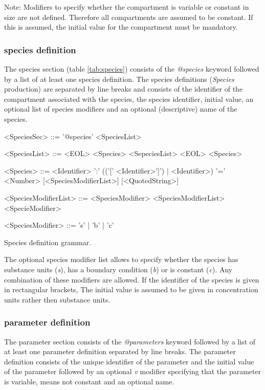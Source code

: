 \documentclass[a4paper]{article}
\begin{document}
Note: Modifiers to specify whether the compartment is variable or constant in size are not defined. Therefore all compartments are assumed to be constant. If this is assumed, the initial value for the compartment must be mandatory.


\subsubsection*{species definition}
The species section (table \ref{tab:species}) consists of the \emph{@species} keyword followed by a list of at least one species definition. The species definitions (\emph{Species} production) are separated by line breaks and consists of the identifier of the compartment associated with the species, the species identifier, initial value, an optional list of species modifiers and an optional (descriptive) name of the species.

\begin{table}[h!]
\begin{grammar}
<SpeciesSec> ::= '@species' <SpeciesList>

<SpeciesList> ::= <EOL> <Species> <SepeciesList> 
 \alt <EOL> <Species> 
 
<Species> ::= <Identifier> ':' (('[' <Identifier>']') | <Identifier>) '=' <Number> [<SpeciesModifierList>] [<QuotedString>]

<SpeciesModifierList> ::= <SpeciesModifier> <SpeciesModifierList>
  \alt <SpecieModifier>
  
<SpeciesModifier> ::= 's' | 'b' | 'c'
\end{grammar}
\caption{Species definition grammar.} \label{tab:species}
\end{table}

The optional species modifier list allows to specify whether the species has substance units (\emph{s}), has a boundary condition (\emph{b}) or is constant (\emph{c}). Any combination of these modifiers are allowed. If the identifier of the species is given in rectangular brackets, The initial value is assumed to be given in concentration units rather then substance units.


\subsubsection*{parameter definition}
The parameter section consists of the \emph{@parameters} keyword followed by a list of at least one parameter definition separated by line breaks. The parameter definition consists of the unique identifier of the parameter and the initial value of the parameter followed by an optional \emph{v} modifier specifying that the parameter is variable, means not constant and an optional name.
\end{document}
